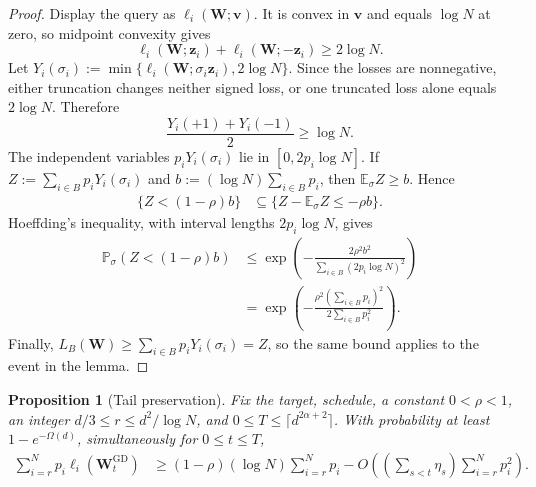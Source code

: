 \documentclass[11pt]{article}
\newtheorem{proposition}[proposition]{Proposition}
\theoremstyle{definition}
\newcommand{\vb}{\mathbf{v}}
\newcommand{\zb}{\mathbf{z}}
\newcommand{\Wb}{\mathbf{W}}
\newcommand{\EE}{\mathbb{E}}
\newcommand{\PP}{\mathbb{P}}
\begin{document}
\begin{proof}
Display the query as $\ell_i(\Wb;\vb)$.  It is convex in $\vb$ and equals
$\log N$ at zero, so midpoint convexity gives
\[
 \ell_i(\Wb;\zb_i)+\ell_i(\Wb;-\zb_i)\geq2\log N.
\]
Let
$Y_i(\sigma_i):=\min\{\ell_i(\Wb;\sigma_i\zb_i),2\log N\}$.  Since the
losses are nonnegative, either truncation changes neither signed loss, or
one truncated loss alone equals $2\log N$.  Therefore
\[
 \frac{Y_i(+1)+Y_i(-1)}2\geq\log N.
\]
The independent variables $p_iY_i(\sigma_i)$ lie in
$[0,2p_i\log N]$.  If
$Z:=\sum_{i\in B}p_iY_i(\sigma_i)$ and
$b:=(\log N)\sum_{i\in B}p_i$, then $\EE_\sigma Z\geq b$.  Hence
\begin{align*}
 \{Z<(1-\rho)b\}
 &\subseteq
 \{Z-\EE_\sigma Z\leq-\rho b\}.
\end{align*}
Hoeffding's inequality, with interval lengths $2p_i\log N$, gives
\begin{align*}
 \PP_\sigma(Z<(1-\rho)b)
 &\leq
 \exp\!\left(
  -\frac{2\rho^2b^2}{\sum_{i\in B}(2p_i\log N)^2}
 \right)\\
 &=\exp\!\left(
  -\frac{\rho^2(\sum_{i\in B}p_i)^2}
  {2\sum_{i\in B}p_i^2}
 \right).
\end{align*}
Finally,
$L_B(\Wb)\geq\sum_{i\in B}p_iY_i(\sigma_i)=Z$, so the same bound applies
to the event in the lemma.
\end{proof}

\begin{proposition}[Tail preservation]
\label{prop:tail-v2}
Fix the target, schedule, a constant $0<\rho<1$, an integer
$d/3\leq r\leq d^2/\log N$, and
$0\leq T\leq\lceil d^{2\alpha+2}\rceil$.  With probability at least
$1-e^{-\Omega(d)}$, simultaneously for $0\leq t\leq T$,
\begin{align*}
 \sum_{i=r}^Np_i\ell_i(\Wb_t^{\mathrm{GD}})
 &\geq(1-\rho)(\log N)\sum_{i=r}^Np_i-O\!\left(
  \left(\sum_{s<t}\eta_s\right)
  \sum_{i=r}^Np_i^2
 \right).
\end{align*}
\end{proposition}
\end{document}

